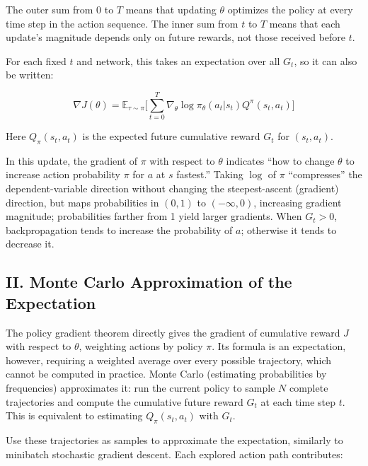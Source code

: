 The outer sum from 0 to \(T\) means that updating \(\theta\) optimizes the policy at every time step in the action sequence. The inner sum from \(t\) to \(T\) means that each update's magnitude depends only on future rewards, not those received before \(t\).

For each fixed \(t\) and network, this takes an expectation over all \(G_t\), so it can also be written:

\[
\nabla J(\theta)
=\mathbb{E}_{\tau\sim\pi}
\bigl[
\sum_{t=0}^{T}
\nabla_\theta\log\pi_\theta(a_t|s_t)Q^{\pi}(s_t,a_t)
\bigr]
\]

Here \(Q_\pi(s_t,a_t)\) is the expected future cumulative reward \(G_t\) for \((s_t,a_t)\).

In this update, the gradient of \(\pi\) with respect to \(\theta\) indicates ``how to change \(\theta\) to increase action probability \(\pi\) for \(a\) at \(s\) fastest.'' Taking \(\log\) of \(\pi\) ``compresses'' the dependent-variable direction without changing the steepest-ascent (gradient) direction, but maps probabilities in \((0,1)\) to \((-\infty,0)\), increasing gradient magnitude; probabilities farther from 1 yield larger gradients. When \(G_t>0\), backpropagation tends to increase the probability of \(a\); otherwise it tends to decrease it.

\hypertarget{ii.-monte-carlo-approximation-of-the-expectation}{%
\subsection{II. Monte Carlo Approximation of the Expectation}\label{ii.-monte-carlo-approximation-of-the-expectation}}

The policy gradient theorem directly gives the gradient of cumulative reward \(J\) with respect to \(\theta\), weighting actions by policy \(\pi\). Its formula is an expectation, however, requiring a weighted average over every possible trajectory, which cannot be computed in practice. Monte Carlo (estimating probabilities by frequencies) approximates it: run the current policy to sample \(N\) complete trajectories and compute the cumulative future reward \(G_t\) at each time step \(t\). This is equivalent to estimating \(Q_\pi(s_t,a_t)\) with \(G_t\).

Use these trajectories as samples to approximate the expectation, similarly to minibatch stochastic gradient descent. Each explored action path contributes:

